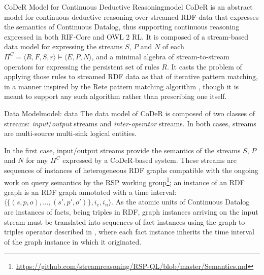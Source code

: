 \begin{nestedsection}{CoDeR Model for Continuous Deductive Reasoning}{model}
	CoDeR is an abstract model for continuous deductive reasoning over streamed RDF data that expresses the semantics of Continuous Datalog, thus supporting continuous reasoning expressed in both RIF-Core and OWL 2 RL.
	It is composed of a stream-based data model for expressing the streams $S$, $P$ and $N$ of each ${\Pi^C = \langle R,F,S,r \rangle \vDash \langle E,P,N \rangle}$, and a minimal algebra of stream-to-stream operators for expressing the persistent set of rules $R$.
	It casts the problem of applying those rules to streamed RDF data as that of iterative pattern matching, in a manner inspired by the Rete pattern matching algorithm \citep{forgy79}, though it is meant to support any such algorithm rather than prescribing one itself.

	\begin{nestedsection}{Data Model}{model: data}
		The data model of CoDeR is composed of two classes of streams: \emph{input}/\emph{output} streams and \emph{inter-operator} streams.
		In both cases, streams are multi-source multi-sink logical entities.

		In the first case, input/output streams provide the semantics of the streams $S$, $P$ and $N$ for any $\Pi^C$ expressed by a CoDeR-based system.
		These streams are sequences of instances of heterogeneous RDF graphs compatible with the ongoing work on query semantics by the RSP working group\footnote{\url{https://github.com/streamreasoning/RSP-QL/blob/master/Semantics.md}};
		an instance of an RDF graph is an RDF graph annotated with a time interval: ${\langle \{(s,p,o),\dots,(s',p',o')\},i_{e},i_{n} \rangle}$.
		As the atomic units of Continuous Datalog are instances of facts, being triples in RDF, graph instances arriving on the input stream must be translated into sequences of fact instances using the graph-to-triples operator described in , where each fact instance inherits the time interval of the graph instance in which it originated.


\end{nestedsection}
\end{nestedsection}
